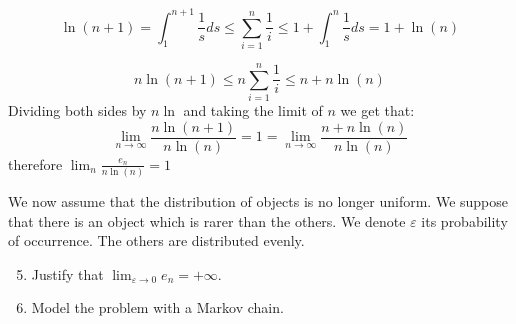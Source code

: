 \documentclass[a4paper,11pt]{exam}
\begin{document}
\begin{questions}
\begin{enumerate}
\begin{solution}
		\[
			\ln(n+1)=\int_1^{n+1}\frac{1}{s}ds\leq \sum_{i=1}^n \frac{1}{i}\leq 1+ \int_1^{n}\frac{1}{s}ds =1 + \ln(n)
		\]
		
		\[
		n\ln(n+1)\leq n\sum_{i=1}^n \frac{1}{i}\leq n + n\ln(n)
		\]
	Dividing both sides by $n\ln$ and taking the limit of $n$ we get that:
	\[
		\lim_{n\rightarrow\infty}\frac{n\ln(n+1)}{n\ln(n)} = 1 = \lim_{n\rightarrow\infty}\frac{n+n\ln(n)}{n\ln(n)}
	\] 
	therefore $\lim_{n}\frac{e_n}{n\ln(n)}=1$
		
		
	\end{solution}
\end{enumerate}

We now assume that the distribution of objects is no longer uniform. We suppose that there is an object which is rarer than the others. We denote $ \varepsilon $ its probability of occurrence.
The others are distributed evenly.
\begin{enumerate}\setcounter{enumi}{4}
	\item Justify that $\lim_{\varepsilon \to 0} e_n = +\infty .$
	\item Model the problem with a Markov chain.
	
\end{enumerate}





\end{questions}
\end{document}
